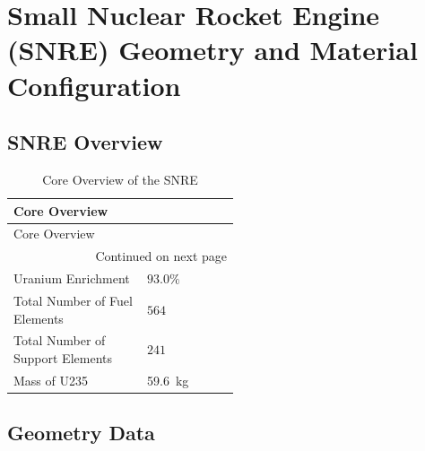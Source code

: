 \documentclass[8pt,a4paper]{article}
\begin{document}
\scriptsize


\centering

\section*{Small Nuclear Rocket Engine (SNRE) Geometry and Material Configuration}

\raggedright

\subsection*{SNRE Overview}

\begin{longtable}{|m{0.3\linewidth}|m{0.2\linewidth}|}
    \caption{Core Overview of the SNRE} \\
    
    \hline \multicolumn{2}{|l|}{{Core Overview}} \\ \hline 
    \endfirsthead
    
    
    \hline \multicolumn{2}{|l|}{{Core Overview}} \\ \hline 
    \endhead
    
    \hline \multicolumn{2}{|r|}{{Continued on next page}} \\ \hline
    \endfoot
    
    \hline
    \endlastfoot
    Uranium Enrichment & $93.0\%$\\
    Total Number of Fuel Elements & $564$\\
    Total Number of Support Elements & $241$\\
    Mass of U235 & \SI{59.6}{kg}\\
\end{longtable}

\subsection*{Geometry Data}
\end{document}
